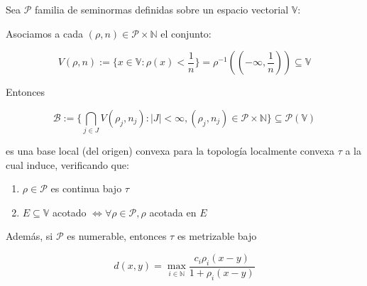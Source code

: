 \begin{prop}
	Sea $\mathcal{P}$ familia de seminormas definidas sobre un espacio vectorial $\mathbb{V}$:
	
	
	Asociamos a cada $(\rho,n) \in \mathcal{P} \times \mathbb{N}$ el conjunto:
	
	\begin{equation*}
		V(\rho,n) := \{x \in \mathbb{V} : \rho(x) < \frac{1}{n} \} = \rho^{-1} ((  -\infty,\frac{1}{n}  ) ) \subseteq \mathbb{V}
	\end{equation*} 
	
	Entonces
	
	\begin{equation*}
		\mathcal{B} := \{\bigcap_{j \in J}V(\rho_j,n_j) : |J| < \infty ,(\rho_j,n_j) \in \mathcal{P} \times \mathbb{N} \} \subseteq \mathcal{P}(\mathbb{V})
	\end{equation*} 
	
	es una base local (del origen) convexa para la topología localmente convexa $\tau$ a la cual induce, verificando que:
	
	\begin{enumerate}
		\item $\rho \in \mathcal{P}$ es continua bajo $\tau$
		\item $E\subseteq \mathbb{V}$ acotado $\iff \forall \rho \in \mathcal{P}, \rho$ acotada en $E$
	\end{enumerate}
	
	Además, si $\mathcal{P}$ es numerable, entonces $\tau$ es metrizable bajo
	
	\begin{equation*}
		d(x,y) = \max_{i \in \mathbb{N}} \frac{c_i \rho_i(x-y)}{1+\rho_i(x-y)}
	\end{equation*}
\end{prop}

